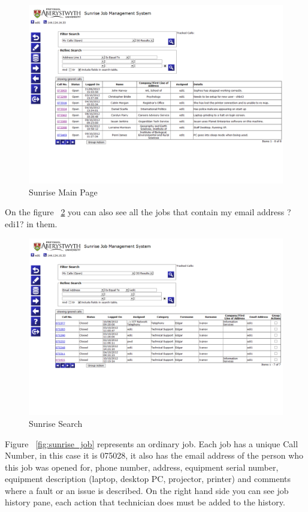 \documentclass[10pt,a4paper,headinclude=true]{report}
\begin{document}
\begin{figure}[H]
\centering
\centerline{\includegraphics[scale=0.5]{./sunrise_main}}
\caption{Sunrise Main Page}
\label{fig:sunrise_main}
\end{figure}

On the figure ~\ref{fig:sunrise_search} you can also see all the jobs that contain my email address ?edi1? in them.

\begin{figure}[H]
\centering
\centerline{\includegraphics[scale=0.5]{./sunrise_search}}
\caption{Sunrise Search}
\label{fig:sunrise_search}
\end{figure}


Figure ~\ref{fig:sunrise_job} represents an ordinary job. Each job has a unique Call Number, in this case it is 075028, it also has the email address of the person who this job was opened for, phone number, address, equipment serial number, equipment description (laptop, desktop PC, projector, printer) and comments where a fault or an issue is described. On the right hand side you can see job history pane, each action that technician does must be added to the history.
\end{document}
